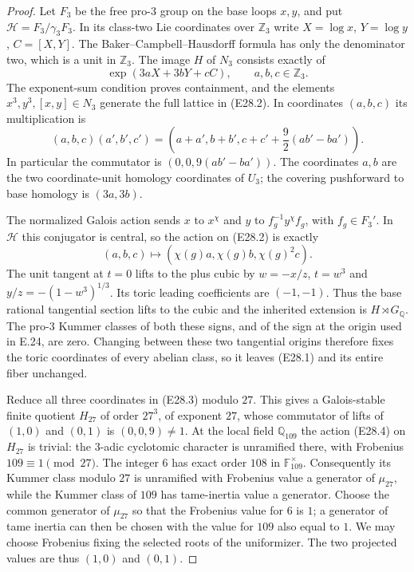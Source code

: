 \begin{proof}
Let $F_3$ be the free pro-$3$ group on the base loops $x,y$,
and put $\mathcal H=F_3/\gamma_3F_3$.
In its class-two Lie coordinates over $\mathbb Z_3$ write
$X=\log x$, $Y=\log y$, $C=[X,Y]$.
The Baker--Campbell--Hausdorff formula has only the denominator
two, which is a unit in $\mathbb Z_3$.
The image $H$ of $N_3$ consists exactly of
\[
 \exp(3aX+3bY+cC),\qquad a,b,c\in\mathbb Z_3.
 \tag{E28.2}
\]
The exponent-sum condition proves containment, and the elements
$x^3,y^3,[x,y]\in N_3$ generate the full lattice in (E28.2).
In coordinates $(a,b,c)$ its multiplication is
\[
 (a,b,c)(a',b',c')=
 \left(a+a',b+b',
 c+c'+\frac92(ab'-ba')\right).
 \tag{E28.3}
\]
In particular the commutator is $(0,0,9(ab'-ba'))$.
The coordinates $a,b$ are the two coordinate-unit homology
coordinates of $U_3$; the covering pushforward to base
homology is $(3a,3b)$.

The normalized Galois action sends $x$ to $x^\chi$ and
$y$ to $f_g^{-1}y^\chi f_g$, with $f_g\in F_3'$.
In $\mathcal H$ this conjugator is central, so the action on
(E28.2) is exactly
\[
 (a,b,c)\longmapsto(\chi(g)a,\chi(g)b,\chi(g)^2c).
 \tag{E28.4}
\]
The unit tangent at $t=0$ lifts to the plus cubic by
$w=-x/z$, $t=w^3$ and $y/z=-(1-w^3)^{1/3}$.
Its toric leading coefficients are $(-1,-1)$.
Thus the base rational tangential section lifts to the cubic
and the inherited extension is $H\rtimes G_{\mathbb Q}$.
The pro-$3$ Kummer classes of both these signs, and of the
sign at the origin used in E.24, are zero. Changing between
these two tangential origins therefore fixes the toric
coordinates of every abelian class, so it leaves (E28.1)
and its entire fiber unchanged.

Reduce all three coordinates in (E28.3) modulo $27$.
This gives a Galois-stable finite quotient $H_{27}$ of order
$27^3$, of exponent $27$, whose commutator of lifts of
$(1,0)$ and $(0,1)$ is $(0,0,9)\ne1$.
At the local field $\mathbb Q_{109}$ the action (E28.4) on
$H_{27}$ is trivial: the $3$-adic cyclotomic character is
unramified there, with Frobenius $109\equiv1\pmod {27}$.
The integer $6$ has exact order $108$ in
$\mathbb F_{109}^{\times}$. Consequently its Kummer class
modulo $27$ is unramified with Frobenius value a generator of
$\mu_{27}$, while the Kummer class of $109$ has tame-inertia
value a generator. Choose the common generator of $\mu_{27}$
so that the Frobenius value for $6$ is $1$; a generator of
tame inertia can then be chosen with the value for $109$
also equal to $1$. We may choose Frobenius fixing the selected
roots of the uniformizer. The two projected values are thus
$(1,0)$ and $(0,1)$.


\end{proof}
